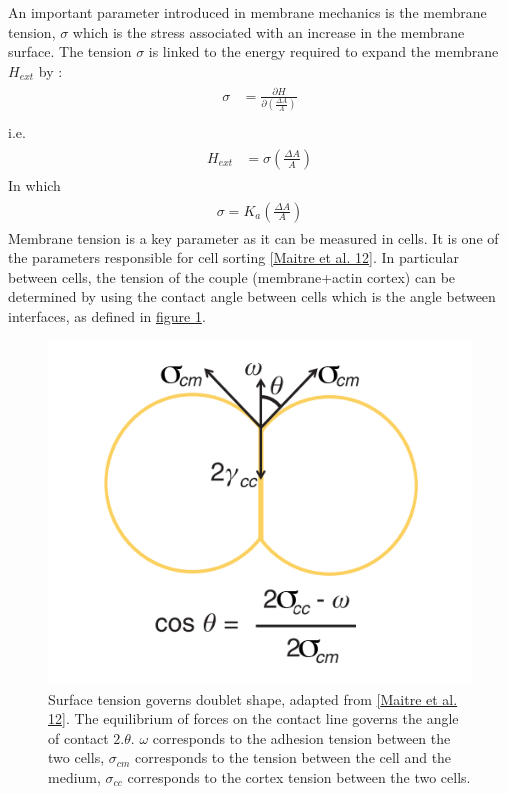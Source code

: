 \documentclass[A4paperpaper,11pt,english]{sphinxmanual}
\begin{document}
An important parameter introduced in membrane mechanics is the  membrane tension,
\(\sigma\) which is the stress associated with an increase in the membrane surface.
The tension \(\sigma\) is linked to the energy required to expand the membrane \(H_{ext}\) by :
\label{index-latex:equation-eqa4}\begin{gather}
\begin{split}\sigma &= \frac {\partial H} {\partial \left(\frac{\Delta A}{A}\right)} \\\end{split}\label{index-latex-eqa4}
\end{gather}
i.e.
\label{index-latex:equation-eqa5}\begin{gather}
\begin{split}H_{ext} &= \sigma\left( \frac {\Delta A} A \right)\end{split}\label{index-latex-eqa5}
\end{gather}
In which
\label{index-latex:equation-eqa6a}\begin{gather}
\begin{split}\sigma =  K_a \left( \frac {\Delta A} A \right)\end{split}\label{index-latex-eqa6a}
\end{gather}
Membrane tension is a key parameter as it can be measured in cells. It is one
of the parameters responsible for cell sorting {\hyperref[index-latex:maitre2012]{{[}Maitre et al. 12{]}}}. In particular
between cells, the tension of the couple (membrane+actin cortex) can be
determined by using the contact angle between cells which is the angle between
interfaces, as defined in \hyperref[index-latex:fig-tension-cell]{figure  \ref*{index-latex:fig-tension-cell}}.
\begin{figure}[htbp]
\centering
\capstart

\includegraphics[width=0.400\linewidth]{Cell-Surface-tension.png}
\caption{Surface tension governs doublet shape,  adapted from {\hyperref[index-latex:maitre2012]{{[}Maitre et al. 12{]}}}.
The equilibrium of forces on the contact line governs the angle of contact
\(2.\theta\). \(\omega\) corresponds to the adhesion tension between
the two cells, \(\sigma_{cm}\) corresponds  to the tension between
the cell and the medium, \(\sigma_{cc}\) corresponds to the cortex
tension between the two cells.}\label{index-latex:fig-tension-cell}\end{figure}
\end{document}
